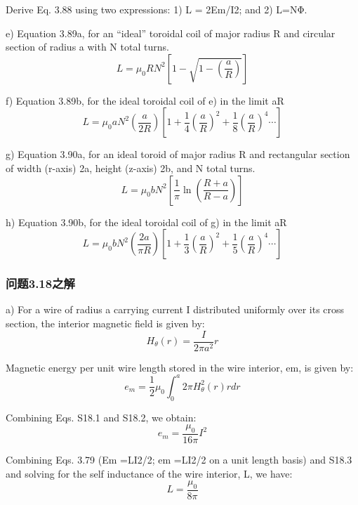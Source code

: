 Derive Eq. 3.88 using two expressions: 1) L = 2Em/I2; and 2) L=NΦ.

e) Equation 3.89a, for an “ideal” toroidal coil of major radius R and circular
section of radius a with N total turns.
 \begin{equation}%
L=\mu_0RN^2[1-\sqrt{1-(\frac{a}{R})}]
\end{equation}

f) Equation 3.89b, for the ideal toroidal coil of e) in the limit aR
 \begin{equation}%
L=\mu_0aN^2(\frac{a}{2R})[1+\frac{1}{4}(\frac{a}{R})^2+\frac{1}{8}(\frac{a}{R})^4\cdots]
\end{equation}

g) Equation 3.90a, for an ideal toroid of major radius R and rectangular section
of width (r-axis) 2a, height (z-axis) 2b, and N total turns.
 \begin{equation}%
L=\mu_0bN^2[\frac{1}{\pi}\ln(\frac{R+a}{R-a})]
\end{equation}

h) Equation 3.90b, for the ideal toroidal coil of g) in the limit aR
 \begin{equation}%
L=\mu_0bN^2(\frac{2a}{\pi R})[1+\frac{1}{3}(\frac{a}{R})^2+\frac{1}{5}(\frac{a}{R})^4\cdots]
\end{equation}


\subsubsection{问题3.18之解}
a) For a wire of radius a carrying current I distributed uniformly over its cross
section, the interior magnetic field is given by:
 \begin{equation}%
H_\theta(r)=\frac{I}{2\pi a^2}r
\end{equation}

Magnetic energy per unit wire length stored in the wire interior, em, is given by:
 \begin{equation}%
e_m=\frac{1}{2}\mu_0\int_{0}^{a}2\pi H_{\theta}^{2}(r)rdr
\end{equation}

Combining Eqs. S18.1 and S18.2, we obtain:
 \begin{equation}%
e_m=\frac{\mu_0}{16\pi}I^2
\end{equation}

Combining Eqs. 3.79 (Em =LI2/2; em =LI2/2 on a unit length basis) and S18.3
and solving for the self inductance of the wire interior, L, we have:
 \begin{equation}%
L=\frac{\mu_0}{8\pi}
\end{equation}


